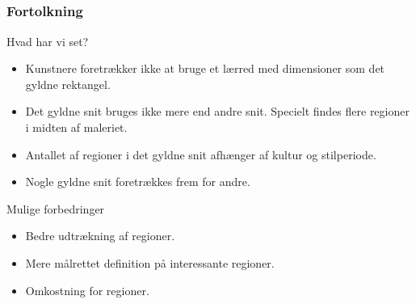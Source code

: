 \documentclass[xcolor=table]{beamer}
\begin{document}
\subsection*{}
\begin{frame}

    \frametitle{Fortolkning}

    \begin{block}{Hvad har vi set?}
        \begin{itemize}
            \item Kunstnere foretrækker ikke at bruge et lærred med dimensioner som det gyldne rektangel.
            \item Det gyldne snit bruges ikke mere end andre snit. Specielt findes flere regioner i midten af maleriet.
            \item Antallet af regioner i det gyldne snit afhænger af kultur og stilperiode.
            \item Nogle gyldne snit foretrækkes frem for andre.
        \end{itemize}
    \end{block}

    \begin{block}{Mulige forbedringer}
        \begin{itemize}
            \item Bedre udtrækning af regioner.
            \item Mere målrettet definition på interessante regioner.
            \item Omkostning for regioner.
        \end{itemize}
    \end{block}

\end{frame}
\end{document}
